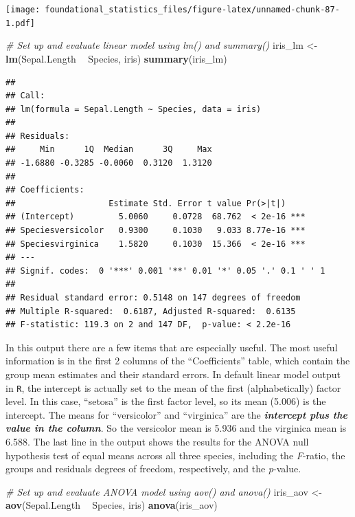 \documentclass[]{book}
\newenvironment{Shaded}{\begin{snugshade}}{\end{snugshade}}
\newcommand{\CommentTok}[1]{\textcolor[rgb]{0.56,0.35,0.01}{\textit{#1}}}
\newcommand{\KeywordTok}[1]{\textcolor[rgb]{0.13,0.29,0.53}{\textbf{#1}}}
\newcommand{\NormalTok}[1]{#1}
\newcommand{\OperatorTok}[1]{\textcolor[rgb]{0.81,0.36,0.00}{\textbf{#1}}}
\newcommand{\StringTok}[1]{\textcolor[rgb]{0.31,0.60,0.02}{#1}}
\begin{document}
\texttt{[image: foundational\_statistics\_files/figure-latex/unnamed-chunk-87-1.pdf]}

\begin{Shaded}
\begin{Highlighting}[]
\CommentTok{# Set up and evaluate linear model using lm() and summary()}
\NormalTok{iris_lm <-}\StringTok{ }\KeywordTok{lm}\NormalTok{(Sepal.Length }\OperatorTok{~}\StringTok{ }\NormalTok{Species, iris)}
\KeywordTok{summary}\NormalTok{(iris_lm)}
\end{Highlighting}
\end{Shaded}

\begin{verbatim}
## 
## Call:
## lm(formula = Sepal.Length ~ Species, data = iris)
## 
## Residuals:
##     Min      1Q  Median      3Q     Max 
## -1.6880 -0.3285 -0.0060  0.3120  1.3120 
## 
## Coefficients:
##                   Estimate Std. Error t value Pr(>|t|)    
## (Intercept)         5.0060     0.0728  68.762  < 2e-16 ***
## Speciesversicolor   0.9300     0.1030   9.033 8.77e-16 ***
## Speciesvirginica    1.5820     0.1030  15.366  < 2e-16 ***
## ---
## Signif. codes:  0 '***' 0.001 '**' 0.01 '*' 0.05 '.' 0.1 ' ' 1
## 
## Residual standard error: 0.5148 on 147 degrees of freedom
## Multiple R-squared:  0.6187, Adjusted R-squared:  0.6135 
## F-statistic: 119.3 on 2 and 147 DF,  p-value: < 2.2e-16
\end{verbatim}

In this output there are a few items that are especially useful. The most useful information is in the first 2 columns of the ``Coefficients'' table, which contain the group mean estimates and their standard errors. In default linear model output in \texttt{R}, the intercept is actually set to the mean of the first (alphabetically) factor level. In this case, ``setosa'' is the first factor level, so its mean (5.006) is the intercept. The means for ``versicolor'' and ``virginica'' are the \textbf{\emph{intercept plus the value in the column}}. So the versicolor mean is 5.936 and the virginica mean is 6.588. The last line in the output shows the results for the ANOVA null hypothesis test of equal means across all three species, including the \emph{F}-ratio, the groups and residuals degrees of freedom, respectively, and the \emph{p}-value.

\begin{Shaded}
\begin{Highlighting}[]
\CommentTok{# Set up and evaluate ANOVA model using aov() and anova()}
\NormalTok{iris_aov <-}\StringTok{ }\KeywordTok{aov}\NormalTok{(Sepal.Length }\OperatorTok{~}\StringTok{ }\NormalTok{Species, iris)}
\KeywordTok{anova}\NormalTok{(iris_aov)}
\end{Highlighting}
\end{Shaded}
\end{document}
